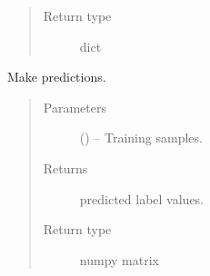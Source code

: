 \documentclass[letterpaper,10pt,english]{sphinxmanual}
\begin{document}
\begin{fulllineitems}
\begin{fulllineitems}
\begin{quote}
\begin{description}
\item[{Return type}] \leavevmode
dict

\end{description}\end{quote}

\end{fulllineitems}


\begin{fulllineitems}
\label{\detokenize{KUHERD:KUHERD.Models.ClassificationModel.predict}}
Make predictions.
\begin{quote}\begin{description}
\item[{Parameters}] \leavevmode
{} () -- Training samples.

\item[{Returns}] \leavevmode
predicted label values.

\item[{Return type}] \leavevmode
numpy matrix

\end{description}\end{quote}

\end{fulllineitems}


\end{fulllineitems}

\end{document}
